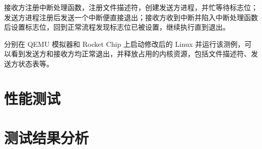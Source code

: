 接收方注册中断处理函数，注册文件描述符，创建发送方进程，并忙等待标志位；发送方进程注册后发送一个中断便直接退出；接收方收到中断并陷入中断处理函数后设置标志位，回到正常流程发现标志位已被设置，继续执行直到退出。



分别在 QEMU 模拟器和 Rocket Chip 上启动修改后的 Linux 并运行该测例，可以看到发送方和接收方均正常退出，并释放占用的内核资源，包括文件描述符、发送方状态表等。

\section{性能测试}

\section{测试结果分析}